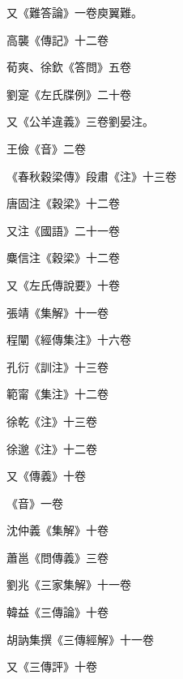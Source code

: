 \begin{pinyinscope}
 又《難答論》一卷庾翼難。



 高襲《傳記》十二卷



 荀爽、徐欽《答問》五卷



 劉寔《左氏牒例》二十卷



 又《公羊違義》三卷劉晏注。



 王儉《音》二卷



 《春秋穀梁傳》段肅《注》十三卷



 唐固注《穀梁》十二卷



 又注《國語》二十一卷



 麋信注《穀梁》十二卷



 又《左氏傳說要》十卷



 張靖《集解》十一卷



 程闡《經傳集注》十六卷



 孔衍《訓注》十三卷



 範甯《集注》十二卷



 徐乾《注》十三卷



 徐邈《注》十二卷



 又《傳義》十卷



 《音》一卷



 沈仲義《集解》十卷



 蕭邕《問傳義》三卷



 劉兆《三家集解》十一卷



 韓益《三傳論》十卷



 胡訥集撰《三傳經解》十一卷



 又《三傳評》十卷




\end{pinyinscope}
